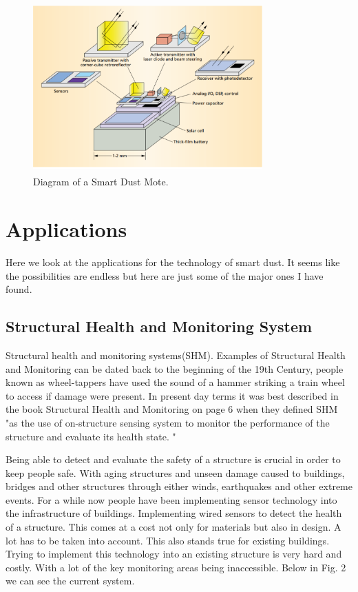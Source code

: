 \documentclass[article]{IEEEtran}
\begin{document}
\begin{figure}[h!]
\graphicspath{ {images/} }
\includegraphics[width=8.8cm, height=6.5cm]{figure1}
\caption{Diagram of a Smart Dust Mote\cite{Mili}.}
\end{figure}

\section{Applications}
Here we look at the applications for the technology of smart dust. It seems like the possibilities are endless but here are just some of the major ones I have found.

\subsection{Structural Health and Monitoring System}
Structural health and monitoring systems(SHM). Examples of Structural Health and Monitoring can be dated back to the beginning of the 19th Century, people known as wheel-tappers have used the sound of a hammer striking a train wheel to access if damage were present. In present day terms it was best described in the book Structural Health and Monitoring on page 6 when they defined SHM "as the use of on-structure sensing system to monitor the performance   of   the   structure   and   evaluate   its   health   state. "\cite{SHM}

Being able to detect and evaluate the safety of a structure is crucial in order to keep people safe. With aging structures and unseen damage caused to buildings, bridges and other structures through either winds, earthquakes and other extreme events. For a while now people have been implementing sensor technology into the infrastructure of buildings. Implementing wired sensors to detect the health of a structure. This comes at a cost not only for materials but also in design. A lot has to be taken into account. This also stands true for existing buildings. Trying to implement this technology into an existing structure is very hard and costly. With a lot of the key monitoring areas being inaccessible. Below in Fig. 2 we can see the current system.
\end{document}

